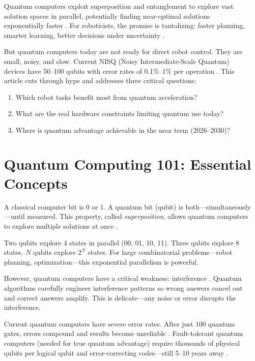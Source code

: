 \documentclass[conference]{IEEEtran}
\begin{document}
Quantum computers exploit superposition and entanglement to explore vast solution spaces in parallel, potentially finding near-optimal solutions exponentially faster \cite{b4, b5}. For roboticists, the promise is tantalizing: faster planning, smarter learning, better decisions under uncertainty \cite{b6, b7, b8}.

But quantum computers today are not ready for direct robot control. They are small, noisy, and slow. Current NISQ (Noisy Intermediate-Scale Quantum) devices have 50--100 qubits with error rates of 0.1\%--1\% per operation \cite{b9, b10, b11}. This article cuts through hype and addresses three critical questions:

\begin{enumerate}
\item Which robot tasks benefit most from quantum acceleration?
\item What are the real hardware constraints limiting quantum use today?
\item Where is quantum advantage achievable in the near term (2026--2030)?
\end{enumerate}

\section{Quantum Computing 101: Essential Concepts}

A classical computer bit is 0 or 1. A quantum bit (qubit) is both---simultaneously---until measured. This property, called \textit{superposition}, allows quantum computers to explore multiple solutions at once \cite{b4, b12}.

Two qubits explore 4 states in parallel (00, 01, 10, 11). Three qubits explore 8 states. $N$ qubits explore $2^N$ states. For large combinatorial problems---robot planning, optimization---this exponential parallelism is powerful.

However, quantum computers have a critical weakness: interference \cite{b4}. Quantum algorithms carefully engineer interference patterns so wrong answers cancel out and correct answers amplify. This is delicate---any noise or error disrupts the interference.

Current quantum computers have severe error rates. After just 100 quantum gates, errors compound and results become unreliable \cite{b9, b10}. Fault-tolerant quantum computers (needed for true quantum advantage) require thousands of physical qubits per logical qubit and error-correcting codes---still 5--10 years away \cite{b13, b14}.
\end{document}
